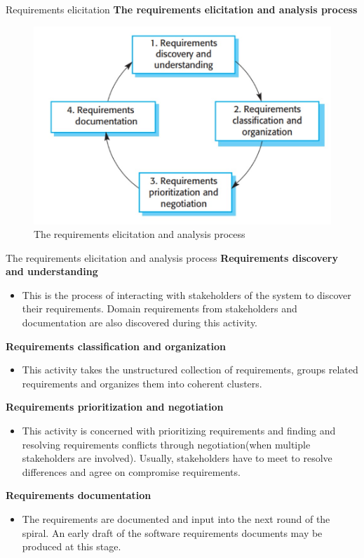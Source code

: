 \documentclass{beamer}
\begin{document}
\begin{frame}{Requirements elicitation}
	\textbf{The requirements elicitation and analysis process }
	\begin{figure}
		\includegraphics[scale=.45]{img/m2_6.jpg}
		\caption{The requirements elicitation and analysis process}
	\end{figure}
\end{frame}
\begin{frame}{The requirements elicitation and analysis process }
	\textbf{Requirements discovery and understanding }
	\begin{itemize}
		\item This is the process of interacting with stakeholders of the system to discover their requirements. Domain requirements from stakeholders and documentation are also discovered during this activity.
	\end{itemize}
\textbf{Requirements classification and organization }
\begin{itemize}
	\item This activity takes the unstructured collection of requirements, groups related requirements and organizes them into coherent clusters.
\end{itemize}
\textbf{Requirements prioritization and negotiation }
\begin{itemize}

	\item This activity is concerned with prioritizing requirements and finding and resolving requirements conflicts through negotiation(when multiple stakeholders are involved). Usually, stakeholders have to meet to resolve differences and agree on compromise requirements.
\end{itemize}
\textbf{Requirements documentation }
\begin{itemize}
	\item The requirements are documented and input into the next round of the spiral. An early draft of the software requirements documents may be produced at this stage.
\end{itemize}
\end{frame}
\end{document}
